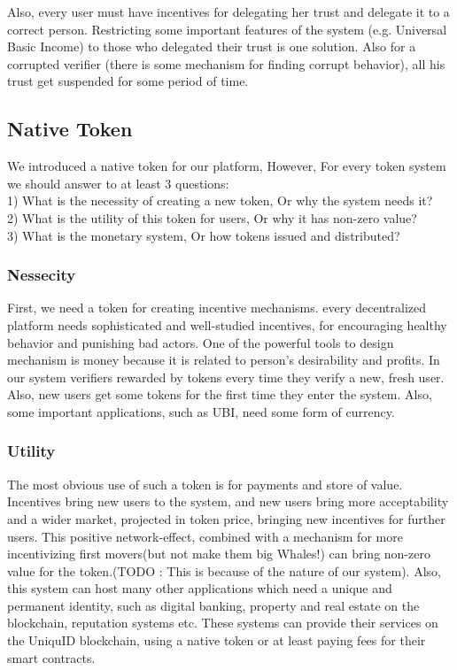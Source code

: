 \documentclass[conference]{IEEEtran}
\begin{document}
Also, every user must have incentives for delegating her trust and delegate it to a correct person. Restricting some important features of the system (e.g. Universal Basic Income) to those who delegated their trust is one solution. Also for a corrupted verifier (there is some mechanism for finding corrupt behavior), all his trust get suspended for some period of time.




\subsection{Native Token}
We introduced a native token for our platform, However, For every  token system we should answer to at least 3 questions:
\\
1) What is the necessity of creating a new token, Or why the system needs it?
\\
2) What is the utility of this token for users, Or why it has non-zero value?
\\
3) What is the monetary system, Or how tokens issued and distributed?
\\
\subsubsection{Nessecity}
First, we need a token for creating incentive mechanisms. every decentralized platform needs sophisticated and well-studied incentives, for encouraging healthy behavior and punishing bad actors. One of the powerful tools to design mechanism is money because it is related to person's desirability and profits. In our system verifiers rewarded by tokens every time they verify a new, fresh user. Also, new users get some tokens for the first time they enter the system. Also, some important applications, such as UBI, need some form of currency.

\subsubsection{Utility} 
The most obvious use of such a token is for payments and store of value. Incentives bring new users to the system, and new users bring more acceptability and a wider market, projected in token price, bringing new incentives for further users. This positive network-effect, combined with a mechanism for more incentivizing first movers(but not make them big Whales!) can bring non-zero value for the token.(TODO : This is because of the nature of our system). Also, this system can host many other applications which need a unique and permanent identity, such as digital banking, property and real estate on the blockchain, reputation systems etc. These systems can provide their services on the UniquID blockchain, using a native token or at least paying fees for their smart contracts.
\end{document}
